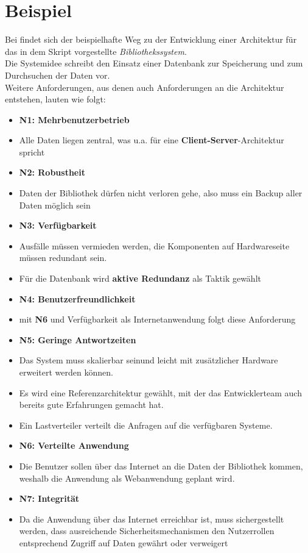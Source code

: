 \section{Beispiel}

Bei \cite[43 ff.]{Wed09b} findet sich der beispielhafte Weg zu der Entwicklung einer Architektur für das in dem Skript vorgestellte \textit{Bibliothekssystem}.\\

\noindent
Die Systemidee schreibt den Einsatz einer Datenbank zur Speicherung und zum Durchsuchen der Daten vor.\\
Weitere Anforderungen, aus denen auch Anforderungen an die Architektur entstehen, lauten wie folgt:

\begin{itemize}
    \item \textbf{N1: Mehrbenutzerbetrieb}
    \item[] Alle Daten liegen zentral, was u.a. für eine \textbf{Client-Server}-Architektur spricht
    \item \textbf{N2: Robustheit}
    \item[] Daten der Bibliothek dürfen nicht verloren gehe, also muss ein Backup aller Daten möglich sein
    \item \textbf{N3: Verfügbarkeit}
    \item[] Ausfälle müssen vermieden werden, die Komponenten auf Hardwareseite müssen redundant sein.
    \item[] Für die Datenbank wird \textbf{aktive Redundanz} als Taktik gewählt
    \item \textbf{N4: Benutzerfreundlichkeit}
    \item[] mit \textbf{N6} und Verfügbarkeit als Internetanwendung folgt diese Anforderung
    \item \textbf{N5: Geringe Antwortzeiten}
    \item[] Das System muss skalierbar seinund leicht mit zusätzlicher Hardware erweitert werden können.
    \item[] Es wird eine Referenzarchitektur gewählt, mit der das Entwicklerteam auch bereits gute Erfahrungen gemacht hat.
    \item[] Ein Lastverteiler verteilt die Anfragen auf die verfügbaren Systeme.
    \item \textbf{N6: Verteilte Anwendung}
    \item[] Die Benutzer sollen über das Internet an die Daten der Bibliothek kommen, weshalb die Anwendung als Webanwendung geplant wird.
    \item \textbf{N7: Integrität}
    \item[] Da die Anwendung über das Internet erreichbar ist, muss sichergestellt werden, dass ausreichende Sicherheitsmechanismen den Nutzerrollen entsprechend Zugriff auf Daten gewährt oder verweigert
\end{itemize}